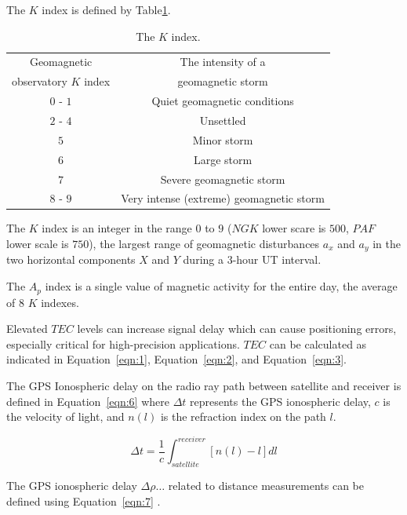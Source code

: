 \documentclass[sn-mathphys-num]{sn-jnl}%
\begin{document}
The $K$ index is defined by Table\ref{tab:K}.

\begin{table}[!ht]
    \centering
    \caption{The $K$ index.}
    \label{tab:K}
    \begin{tabular}{|c|c|}
        \hline
        Geomagnetic & The intensity of a \\ 
        observatory $K$ index & geomagnetic storm \\ \hline
        $0$ - $1$ & Quiet geomagnetic conditions \\ \hline
        $2$ - $4$ & Unsettled \\ \hline
        $5$ & Minor storm \\ \hline
        $6$ & Large storm \\ \hline
        $7$ & Severe geomagnetic storm \\ \hline
        $8$ - $9$ & Very intense (extreme) geomagnetic storm \\ \hline
    \end{tabular}
\end{table}

The $K$ index is an integer in the range $0$ to $9$ ($NGK$ lower scare is $500$, $PAF$ lower scale is $750$), the largest range of geomagnetic disturbances $a_x$ and $a_y$ in the two horizontal components $X$ and $Y$ during a $3$-hour UT interval.

The $A_p$ index is a single value of magnetic activity for the entire day, the average of $8$ $K$ indexes. 
 
Elevated $TEC$ levels can increase signal delay which can cause positioning errors, especially critical for high-precision applications. $TEC$ can be calculated as indicated in Equation~\ref{eqn:1}, Equation~\ref{eqn:2}, and Equation~\ref{eqn:3}. 

The GPS Ionospheric delay on the radio ray path between satellite and receiver is defined in Equation~\ref{eqn:6} \cite{spilker1996global} where $\Delta t$ represents the GPS ionospheric delay, $c$ is the velocity of light, and $n(l)$ is the refraction index on the path $l$.

\begin{equation}
	\Delta t = \frac{1}{c} \int_{satellite}^{receiver} \left[ n(l) - l \right]dl
	\label{eqn:6}
\end{equation}

The GPS ionospheric delay $\Delta \rho \dots$ related to distance measurements can be defined using Equation~\ref{eqn:7} \cite{spilker1996global}.
\end{document}
